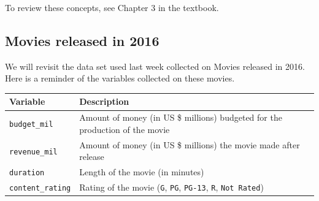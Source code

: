 \documentclass[
]{report}
\begin{document}
To review these concepts, see Chapter 3 in the textbook.

\hypertarget{movies-released-in-2016-1}{%
\subsection{Movies released in 2016}\label{movies-released-in-2016-1}}

We will revisit the data set used last week collected on Movies released in 2016. Here is a reminder of the variables collected on these movies.

\begin{longtable}[]{@{}ll@{}}
\toprule
\begin{minipage}[b]{0.22\columnwidth}\raggedright
\textbf{Variable}\strut
\end{minipage} & \begin{minipage}[b]{0.72\columnwidth}\raggedright
\textbf{Description}\strut
\end{minipage}\tabularnewline
\midrule
\endhead
\begin{minipage}[t]{0.22\columnwidth}\raggedright
\texttt{budget\_mil}\strut
\end{minipage} & \begin{minipage}[t]{0.72\columnwidth}\raggedright
Amount of money (in US \$ millions) budgeted for the production of the movie\strut
\end{minipage}\tabularnewline
\begin{minipage}[t]{0.22\columnwidth}\raggedright
\texttt{revenue\_mil}\strut
\end{minipage} & \begin{minipage}[t]{0.72\columnwidth}\raggedright
Amount of money (in US \$ millions) the movie made after release\strut
\end{minipage}\tabularnewline
\begin{minipage}[t]{0.22\columnwidth}\raggedright
\texttt{duration}\strut
\end{minipage} & \begin{minipage}[t]{0.72\columnwidth}\raggedright
Length of the movie (in minutes)\strut
\end{minipage}\tabularnewline
\begin{minipage}[t]{0.22\columnwidth}\raggedright
\texttt{content\_rating}\strut
\end{minipage} & \begin{minipage}[t]{0.72\columnwidth}\raggedright
Rating of the movie (\texttt{G}, \texttt{PG}, \texttt{PG-13}, \texttt{R}, \texttt{Not\ Rated})\strut

\end{minipage}
\end{longtable}
\end{document}
